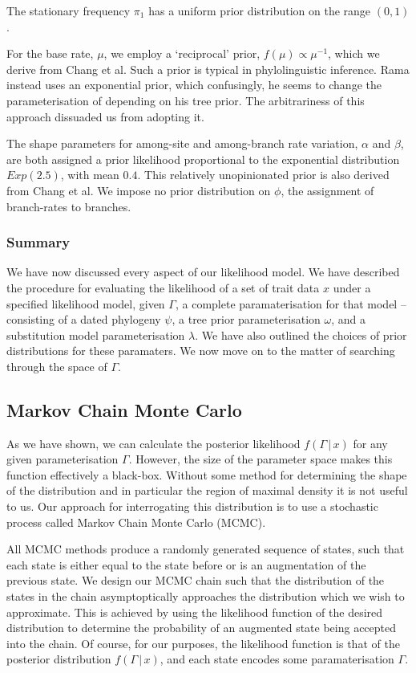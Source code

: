 \documentclass[10pt,journal,compsoc]{IEEEtran}
\begin{document}
The stationary frequency $\pi_1$ has a uniform prior distribution on the range $(0, 1)$.

For the base rate, $\mu$, we employ a `reciprocal' prior, $f(\mu) \propto \mu^{-1}$, which we derive from Chang et al. Such a prior is typical in phylolinguistic inference. Rama instead uses an exponential prior, which confusingly, he seems to change the parameterisation of depending on his tree prior. The arbitrariness of this approach dissuaded us from adopting it.

The shape parameters for among-site and among-branch rate variation, $\alpha$ and $\beta$, are both assigned a prior likelihood proportional to the exponential distribution $Exp(2.5)$, with mean $0.4$. This relatively unopinionated prior is also derived from Chang et al. We impose no prior distribution on $\phi$, the assignment of branch-rates to branches.

\subsubsection{Summary}

We have now discussed every aspect of our likelihood model. We have described the procedure for evaluating the likelihood of a set of trait data $x$ under a specified likelihood model, given $\Gamma$, a complete paramaterisation for that model -- consisting of a dated phylogeny $\psi$, a tree prior parameterisation $\omega$, and a substitution model parameterisation $\lambda$. We have also outlined the choices of prior distributions for these paramaters. We now move on to the matter of searching through the space of $\Gamma$.

\subsection{Markov Chain Monte Carlo}

As we have shown, we can calculate the posterior likelihood $f(\Gamma\,|\,x)$ for any given parameterisation $\Gamma$. However, the size of the parameter space makes this function effectively a black-box. Without some method for determining the shape of the distribution and in particular the region of maximal density it is not useful to us. Our approach for interrogating this distribution is to use a stochastic process called Markov Chain Monte Carlo (MCMC).

All MCMC methods produce a randomly generated sequence of states, such that each state is either equal to the state before or is an augmentation of the previous state. We design our MCMC chain such that the distribution of the states in the chain asymptoptically approaches the distribution which we wish to approximate. This is achieved by using the likelihood function of the desired distribution to determine the probability of an augmented state being accepted into the chain. Of course, for our purposes, the likelihood function is that of the posterior distribution $f(\Gamma\,|\,x)$, and each state encodes some paramaterisation $\Gamma$.  
\end{document}
